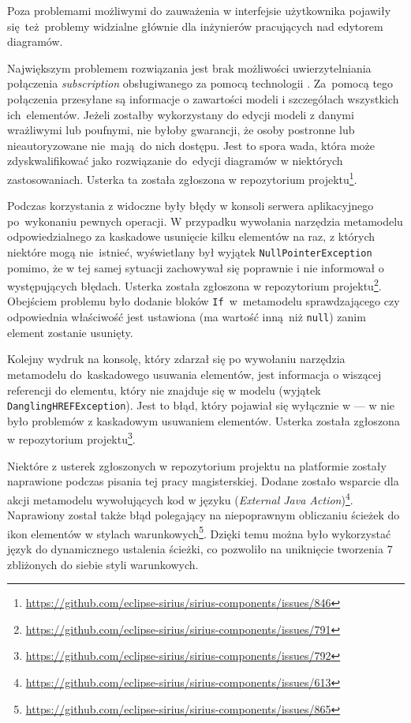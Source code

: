 Poza problemami możliwymi do zauważenia w interfejsie użytkownika \SiriusWeb{}
pojawiły się~też~problemy widzialne głównie dla inżynierów
pracujących nad edytorem diagramów.

Największym problemem rozwiązania \SiriusWeb{} jest brak możliwości
uwierzytelniania połączenia \GraphQL{} \emph{subscription} obsługiwanego za
pomocą technologii \WebSocket{}. Za~pomocą tego połączenia przesyłane są
informacje o zawartości modeli i szczegółach wszystkich ich~elementów. Jeżeli
\SiriusWeb{} zostałby wykorzystany do edycji modeli z danymi wrażliwymi
lub poufnymi, nie byłoby gwarancji, że osoby postronne lub nieautoryzowane
nie~mają do nich dostępu. Jest to spora wada, która może zdyskwalifikować
\SiriusWeb{} jako rozwiązanie do~edycji diagramów w niektórych
zastosowaniach. Usterka ta została zgłoszona w repozytorium
projektu\footnote{
	\url{https://github.com/eclipse-sirius/sirius-components/issues/846}}.

Podczas korzystania z \SiriusWeb{} widoczne były błędy w konsoli serwera
aplikacyjnego po~wykonaniu pewnych operacji. W przypadku wywołania narzędzia
metamodelu odpowiedzialnego za kaskadowe usunięcie kilku elementów na raz, z
których niektóre mogą nie~istnieć, wyświetlany był wyjątek
\texttt{NullPointerException} pomimo, że w tej samej sytuacji \SiriusDesktop{}
zachowywał się poprawnie i nie informował o występujących
błędach.
Usterka została zgłoszona w repozytorium projektu\footnote{
	\url{https://github.com/eclipse-sirius/sirius-components/issues/791}
}. Obejściem problemu było dodanie bloków \texttt{If}~w~metamodelu
sprawdzającego czy odpowiednia właściwość jest ustawiona (ma wartość inną niż
\texttt{null}) zanim element zostanie usunięty.

Kolejny wydruk na konsolę, który zdarzał się po wywołaniu narzędzia metamodelu
do~kaskadowego usuwania elementów, jest informacja o wiszącej referencji do
elementu, który nie znajduje się w modelu (wyjątek
\texttt{DanglingHREFException}). Jest to błąd, który pojawiał się wyłącznie w
\SiriusWeb{} --- w \SiriusDesktop{} nie było problemów z kaskadowym
usuwaniem elementów. Usterka została zgłoszona w repozytorium
projektu\footnote{
	\url{https://github.com/eclipse-sirius/sirius-components/issues/792}
}.

Niektóre z usterek zgłoszonych w repozytorium projektu na platformie
\GitHub{} zostały naprawione podczas pisania tej pracy magisterskiej.
Dodane zostało wsparcie dla akcji metamodelu wywołujących kod w języku \Java{}
(\emph{External Java Action})\footnote{
	\url{https://github.com/eclipse-sirius/sirius-components/issues/613}}.
Naprawiony został także błąd polegający na niepoprawnym obliczaniu ścieżek do
ikon elementów w stylach warunkowych\footnote{
	\url{https://github.com/eclipse-sirius/sirius-components/issues/865}
}. Dzięki temu można było wykorzystać język \AQL{} do dynamicznego
ustalenia ścieżki, co pozwoliło na uniknięcie tworzenia 7 zbliżonych do
siebie styli warunkowych.

